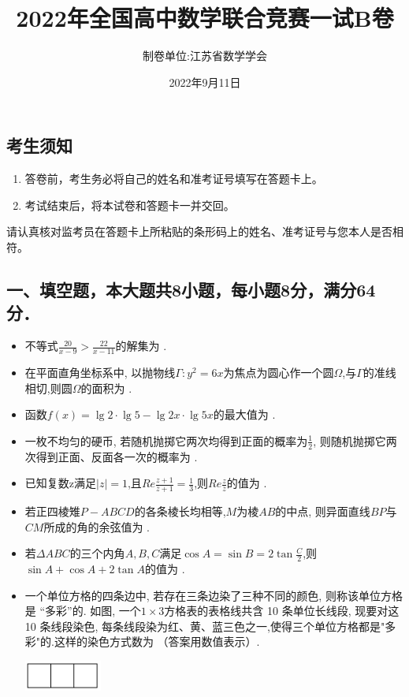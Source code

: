 \documentclass[10pt,a4paper]{ctexart}
\title{\Large{\textbf{2022年全国高中数学联合竞赛一试B卷}}}
\date{2022年9月11日}
\author{制卷单位:江苏省数学学会}
\newcommand{\tk}[1][2.5]{\,\underline{\mbox{\hspace{#1 cm}}}\,}
\begin{document}
	\maketitle
	\subsection*{考生须知}
	\begin{enumerate}
		\item 答卷前，考生务必将自己的姓名和准考证号填写在答题卡上。
		\item 考试结束后，将本试卷和答题卡一并交回。
	\end{enumerate}
	请认真核对监考员在答题卡上所粘贴的条形码上的姓名、准考证号与您本人是否相符。	
	\subsection*{一、填空题，本大题共8小题，每小题8分，满分64分．}
	\begin{spacing}{1.8}
		\begin{itemize}
			\item[1.] 不等式$\frac{20}{x-9}>\frac{22}{x-11}$的解集为\tk.
			\item[2.] 在平面直角坐标系中, 以抛物线$\Gamma :y^2=6x$为焦点为圆心作一个圆$\Omega$,与$\Gamma$的准线相切,则圆$\Omega$的面积为\tk.
			\item[3.] 函数$f(x)=\lg{2} \cdot \lg{5}-\lg{2x} \cdot \lg{5x}$的最大值为\tk. 
			\item[4.] 一枚不均匀的硬币, 若随机抛掷它两次均得到正面的概率为$\frac{1}{2}$, 则随机抛掷它两次得到正面、反面各一次的概率为\tk.
			\item[5.] 已知复数z满足$|z|=1$,且$Re\frac{z+1}{\bar{z}+1}=\frac{1}{3}$,则$Re\frac{z}{\bar{z}}$的值为\tk.
			\item[6.] 若正四棱雉$P-ABCD$的各条棱长均相等,$M$为棱$AB$的中点, 则异面直线$BP$与$CM$所成的角的余弦值为\tk.
			\item[7.] 若$\Delta ABC$的三个内角$A,B,C$满足$\cos{A}=\sin{B}=2\tan{\frac{C}{2}}$,则$\sin{A}+\cos{A}+2\tan{A}$的值为\tk.
			\item[8.]一个单位方格的四条边中, 若存在三条边染了三种不同的颜色, 则称该单位方格是 “多彩”的. 如图, 一个$1 \times 3$方格表的表格线共含 10 条单位长线段, 现要对这 10 条线段染色, 每条线段染为红、黄、蓝三色之一,使得三个单位方格都是"多彩"的.这样的染色方式数为\tk（答案用数值表示）.
			\begin{center}
				\includegraphics[width=0.2\textwidth]{tkt1.png}
			\end{center} 
		\end{itemize}
	\end{spacing}
	\newpage
	
\end{document}
